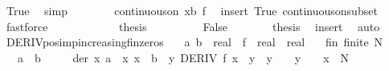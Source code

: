 \begin{isabellebody}
\ True\ \isamarkupfalse%
\ simp\isanewline
\ \ \ \ \ \ \isamarkupfalse%
\ {\isachardoublequoteopen}continuous{\isacharunderscore}{\kern0pt}on\ {\isacharbraceleft}{\kern0pt}x{\isachardot}{\kern0pt}{\isachardot}{\kern0pt}b{\isacharbraceright}{\kern0pt}\ f{\isachardoublequoteclose}\ \isamarkupfalse%
\ insert{\isacharparenleft}{\kern0pt}{}{\isacharparenright}{\kern0pt}\ True\ continuous{\isacharunderscore}{\kern0pt}on{\isacharunderscore}{\kern0pt}subset\ \isamarkupfalse%
\ fastforce\isanewline
\ \ \ \ \isamarkupfalse%
\isanewline
\ \ \ \ \isamarkupfalse%
\ \isamarkupfalse%
\ {\isacharquery}{\kern0pt}thesis\ \isakeywordONE{{\isachardot}{\kern0pt}}\isamarkupfalse%
\isanewline
\ \ \isamarkupfalse%
\isanewline
\ \ \ \ \isamarkupfalse%
\ False\isanewline
\ \ \ \ \isamarkupfalse%
\ \isamarkupfalse%
\ {\isacharquery}{\kern0pt}thesis\ \isamarkupfalse%
\ insert\ \isamarkupfalse%
\ auto\isanewline
\ \ \isamarkupfalse%
\isanewline
{}\isamarkupfalse%
%
\endisatagproof
{\isafoldproof}%
%
\isadelimproof
\isanewline
%
\endisadelimproof
\isanewline
{}\isamarkupfalse%
\ DERIV{\isacharunderscore}{\kern0pt}pos{\isacharunderscore}{\kern0pt}imp{\isacharunderscore}{\kern0pt}increasing{\isacharunderscore}{\kern0pt}fin{\isacharunderscore}{\kern0pt}zeros{\isacharcolon}{\kern0pt}\isanewline
\ \ \ a\ b\ {\isacharcolon}{\kern0pt}{\isacharcolon}{\kern0pt}\ real\ \ f\ {\isacharcolon}{\kern0pt}{\isacharcolon}{\kern0pt}\ {\isachardoublequoteopen}real\ {\isasymRightarrow}\ real{\isachardoublequoteclose}\isanewline
\ \ \ fin{\isacharcolon}{\kern0pt}\ {\isachardoublequoteopen}finite\ N{\isachardoublequoteclose}\isanewline
\ \ \ {\isachardoublequoteopen}a\ {\isacharless}{\kern0pt}\ b{\isachardoublequoteclose}\isanewline
\ \ \ \ \ der{\isacharcolon}{\kern0pt}\ {\isachardoublequoteopen}{\isasymAnd}x{\isachardot}{\kern0pt}\ {\isasymlbrakk}a\ {\isasymle}\ x{\isacharsemicolon}{\kern0pt}\ x\ {\isasymle}\ b{\isasymrbrakk}\ {\isasymLongrightarrow}\ {\isasymexists}y{\isachardot}{\kern0pt}\ DERIV\ f\ x\ {\isacharcolon}{\kern0pt}{\isachargreater}{\kern0pt}\ y\ {\isasymand}\ y\ {\isasymge}\ {}\ {\isasymand}\ {\isacharparenleft}{\kern0pt}y\ {\isacharequal}{\kern0pt}\ {}\ {\isasymlongrightarrow}\ x\ {\isasymin}\ N{\isacharparenright}{\kern0pt}{\isachardoublequoteclose}\isanewline

\end{isabellebody}
